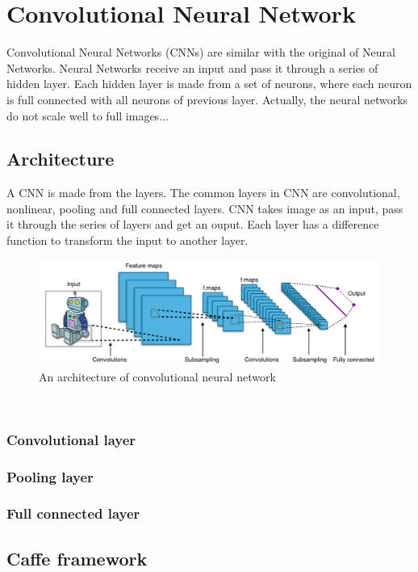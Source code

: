 \chapter{Convolutional Neural Network}
Convolutional Neural Networks (CNNs) are similar with the original of Neural Networks. Neural Networks receive an input and pass it through a series of hidden layer. Each hidden layer is made from a set of neurons, where each neuron is full connected with all neurons of previous layer. Actually, the neural networks do not scale well to full images...
\section{Architecture}
A CNN is made from the layers. The common layers in CNN are convolutional, nonlinear, pooling and full connected layers. CNN takes image as an input, pass it through the series of layers and get an ouput. Each layer has a difference function to transform the input to another layer. 
\begin{figure}[h]
	\centering
	\includegraphics[scale=0.45]{images/cnn_architecture}
	\caption{An architecture of convolutional neural network}
	\label{figlncex}
\end{figure}~\\
\subsection{Convolutional layer}
\subsection{Pooling layer}
\subsection{Full connected layer}
\section{Caffe framework}